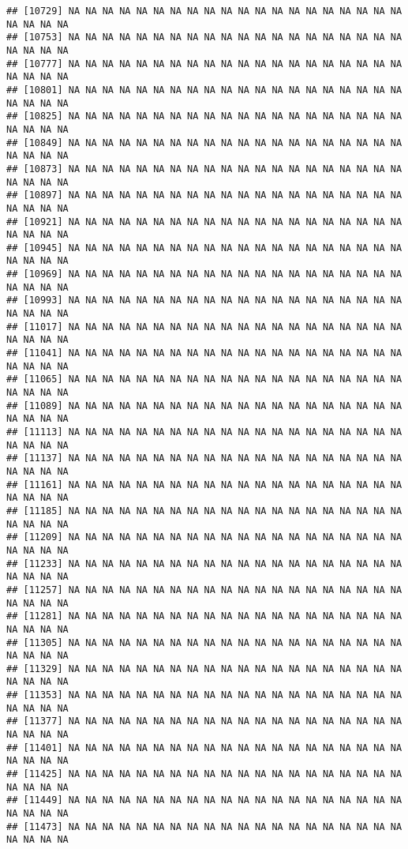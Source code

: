 \documentclass[
]{article}
\begin{document}
\begin{verbatim}
## [10729] NA NA NA NA NA NA NA NA NA NA NA NA NA NA NA NA NA NA NA NA NA NA NA NA
## [10753] NA NA NA NA NA NA NA NA NA NA NA NA NA NA NA NA NA NA NA NA NA NA NA NA
## [10777] NA NA NA NA NA NA NA NA NA NA NA NA NA NA NA NA NA NA NA NA NA NA NA NA
## [10801] NA NA NA NA NA NA NA NA NA NA NA NA NA NA NA NA NA NA NA NA NA NA NA NA
## [10825] NA NA NA NA NA NA NA NA NA NA NA NA NA NA NA NA NA NA NA NA NA NA NA NA
## [10849] NA NA NA NA NA NA NA NA NA NA NA NA NA NA NA NA NA NA NA NA NA NA NA NA
## [10873] NA NA NA NA NA NA NA NA NA NA NA NA NA NA NA NA NA NA NA NA NA NA NA NA
## [10897] NA NA NA NA NA NA NA NA NA NA NA NA NA NA NA NA NA NA NA NA NA NA NA NA
## [10921] NA NA NA NA NA NA NA NA NA NA NA NA NA NA NA NA NA NA NA NA NA NA NA NA
## [10945] NA NA NA NA NA NA NA NA NA NA NA NA NA NA NA NA NA NA NA NA NA NA NA NA
## [10969] NA NA NA NA NA NA NA NA NA NA NA NA NA NA NA NA NA NA NA NA NA NA NA NA
## [10993] NA NA NA NA NA NA NA NA NA NA NA NA NA NA NA NA NA NA NA NA NA NA NA NA
## [11017] NA NA NA NA NA NA NA NA NA NA NA NA NA NA NA NA NA NA NA NA NA NA NA NA
## [11041] NA NA NA NA NA NA NA NA NA NA NA NA NA NA NA NA NA NA NA NA NA NA NA NA
## [11065] NA NA NA NA NA NA NA NA NA NA NA NA NA NA NA NA NA NA NA NA NA NA NA NA
## [11089] NA NA NA NA NA NA NA NA NA NA NA NA NA NA NA NA NA NA NA NA NA NA NA NA
## [11113] NA NA NA NA NA NA NA NA NA NA NA NA NA NA NA NA NA NA NA NA NA NA NA NA
## [11137] NA NA NA NA NA NA NA NA NA NA NA NA NA NA NA NA NA NA NA NA NA NA NA NA
## [11161] NA NA NA NA NA NA NA NA NA NA NA NA NA NA NA NA NA NA NA NA NA NA NA NA
## [11185] NA NA NA NA NA NA NA NA NA NA NA NA NA NA NA NA NA NA NA NA NA NA NA NA
## [11209] NA NA NA NA NA NA NA NA NA NA NA NA NA NA NA NA NA NA NA NA NA NA NA NA
## [11233] NA NA NA NA NA NA NA NA NA NA NA NA NA NA NA NA NA NA NA NA NA NA NA NA
## [11257] NA NA NA NA NA NA NA NA NA NA NA NA NA NA NA NA NA NA NA NA NA NA NA NA
## [11281] NA NA NA NA NA NA NA NA NA NA NA NA NA NA NA NA NA NA NA NA NA NA NA NA
## [11305] NA NA NA NA NA NA NA NA NA NA NA NA NA NA NA NA NA NA NA NA NA NA NA NA
## [11329] NA NA NA NA NA NA NA NA NA NA NA NA NA NA NA NA NA NA NA NA NA NA NA NA
## [11353] NA NA NA NA NA NA NA NA NA NA NA NA NA NA NA NA NA NA NA NA NA NA NA NA
## [11377] NA NA NA NA NA NA NA NA NA NA NA NA NA NA NA NA NA NA NA NA NA NA NA NA
## [11401] NA NA NA NA NA NA NA NA NA NA NA NA NA NA NA NA NA NA NA NA NA NA NA NA
## [11425] NA NA NA NA NA NA NA NA NA NA NA NA NA NA NA NA NA NA NA NA NA NA NA NA
## [11449] NA NA NA NA NA NA NA NA NA NA NA NA NA NA NA NA NA NA NA NA NA NA NA NA
## [11473] NA NA NA NA NA NA NA NA NA NA NA NA NA NA NA NA NA NA NA NA NA NA NA NA

\end{verbatim}
\end{document}
